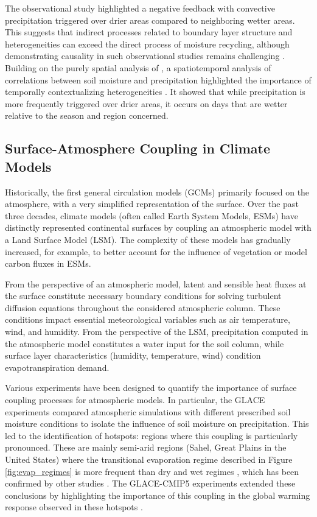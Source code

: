The observational study \citet{taylor_afternoon_2012} highlighted a negative feedback with convective precipitation triggered over drier areas compared to neighboring wetter areas. This suggests that indirect processes related to boundary layer structure and heterogeneities can exceed the direct process of moisture recycling, although demonstrating causality in such observational studies remains challenging \citep{salvucci_investigating_2002, guillod_land-surface_2014}. Building on the purely spatial analysis of \citet{taylor_afternoon_2012}, a spatiotemporal analysis of correlations between soil moisture and precipitation highlighted the importance of temporally contextualizing heterogeneities \citep{guillod_reconciling_2015}. It showed that while precipitation is more frequently triggered over drier areas, it occurs on days that are wetter relative to the season and region concerned.

\subsection{Surface-Atmosphere Coupling in Climate Models}

Historically, the first general circulation models (GCMs) primarily focused on the atmosphere, with a very simplified representation of the surface. Over the past three decades, climate models (often called Earth System Models, ESMs) have distinctly represented continental surfaces by coupling an atmospheric model with a Land Surface Model (LSM). The complexity of these models has gradually increased, for example, to better account for the influence of vegetation or model carbon fluxes in ESMs.

From the perspective of an atmospheric model, latent and sensible heat fluxes at the surface constitute necessary boundary conditions for solving turbulent diffusion equations throughout the considered atmospheric column. These conditions impact essential meteorological variables such as air temperature, wind, and humidity. From the perspective of the LSM, precipitation computed in the atmospheric model constitutes a water input for the soil column, while surface layer characteristics (humidity, temperature, wind) condition evapotranspiration demand.

Various experiments have been designed to quantify the importance of surface coupling processes for atmospheric models. In particular, the GLACE experiments \citep{koster_glace_2006} compared atmospheric simulations with different prescribed soil moisture conditions to isolate the influence of soil moisture on precipitation. This led to the identification of hotspots: regions where this coupling is particularly pronounced. These are mainly semi-arid regions (Sahel, Great Plains in the United States) where the transitional evaporation regime described in Figure \ref{fig:evap_regimes} is more frequent than dry and wet regimes \citep{koster_regions_2004}, which has been confirmed by other studies \citep{dirmeyer_terrestrial_2011, zou_precipitation_2023}. The GLACE-CMIP5 experiments \citep{seneviratne_impact_2013} extended these conclusions by highlighting the importance of this coupling in the global warming response observed in these hotspots \citep{berg_interannual_2015}.

